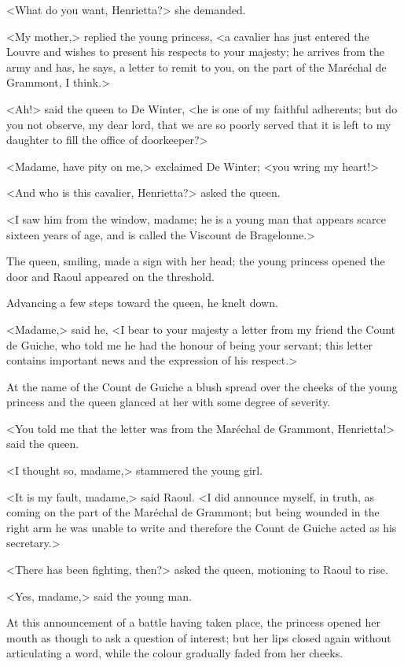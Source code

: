 <What do you want, Henrietta?> she demanded.

<My mother,> replied the young princess, <a cavalier has just entered the Louvre and wishes to present his respects to your majesty; he arrives from the army and has, he says, a letter to remit to you, on the part of the Maréchal de Grammont, I think.>

<Ah!> said the queen to De Winter, <he is one of my faithful adherents; but do you not observe, my dear lord, that we are so poorly served that it is left to my daughter to fill the office of doorkeeper?>

<Madame, have pity on me,> exclaimed De Winter; <you wring my heart!>

<And who is this cavalier, Henrietta?> asked the queen.

<I saw him from the window, madame; he is a young man that appears scarce sixteen years of age, and is called the Viscount de Bragelonne.>

The queen, smiling, made a sign with her head; the young princess opened the door and Raoul appeared on the threshold.

Advancing a few steps toward the queen, he knelt down.

<Madame,> said he, <I bear to your majesty a letter from my friend the Count de Guiche, who told me he had the honour of being your servant; this letter contains important news and the expression of his respect.>

At the name of the Count de Guiche a blush spread over the cheeks of the young princess and the queen glanced at her with some degree of severity.

<You told me that the letter was from the Maréchal de Grammont, Henrietta!> said the queen.

<I thought so, madame,> stammered the young girl.

<It is my fault, madame,> said Raoul. <I did announce myself, in truth, as coming on the part of the Maréchal de Grammont; but being wounded in the right arm he was unable to write and therefore the Count de Guiche acted as his secretary.>

<There has been fighting, then?> asked the queen, motioning to Raoul to rise.

<Yes, madame,> said the young man.

At this announcement of a battle having taken place, the princess opened her mouth as though to ask a question of interest; but her lips closed again without articulating a word, while the colour gradually faded from her cheeks.

